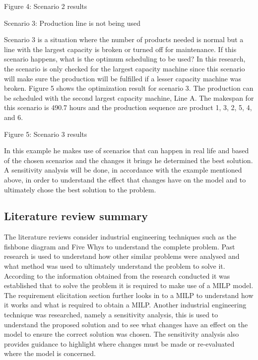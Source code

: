 \documentclass[a4paper,11pt,fleqn]{report}
\begin{document}
                Figure 4: Scenario 2 results
                
                Scenario 3: Production line is not being used
                
                Scenario 3 is a situation where the number of products needed is normal but a line with the largest capacity is broken or turned off for maintenance. If this scenario happens, what is the optimum scheduling to be used? In this research, the scenario is only checked for the largest capacity machine since this scenario will make sure the production will be fulfilled if a lesser capacity machine was broken. Figure 5 shows the optimization result for scenario 3. The production can be scheduled with the second largest capacity machine, Line A. The makespan for this scenario is 490.7 hours and the production sequence are product 1, 3, 2, 5, 4, and 6.
                
                Figure 5: Scenario 3 results
                
                In this example he makes use of scenarios that can happen in real life and based of the chosen scenarios and the changes it brings he determined the best solution. A sensitivity analysis will be done, in accordance with the example mentioned above, in order to understand the effect that changes have on the model and to ultimately chose the best solution to the problem.
                
            \subsection{Literature review summary}
                The literature reviews consider industrial engineering techniques such as the fishbone diagram and Five Whys to understand the complete problem. Past research is used to understand how other similar problems were analysed and what method was used to ultimately understand the problem to solve it.
                According to the information obtained from the research conducted it was established that to solve the problem it is required to make use of a MILP model. The requirement elicitation section further looks in to a MILP to understand how it works and what is required to obtain a MILP.
                Another industrial engineering technique was researched, namely a sensitivity analysis, this is used to understand the proposed solution and to see what changes have an effect on the model to ensure the correct solution was chosen. The sensitivity analysis also provides guidance to highlight where changes must be made or re-evaluated where the model is concerned.
\end{document}
